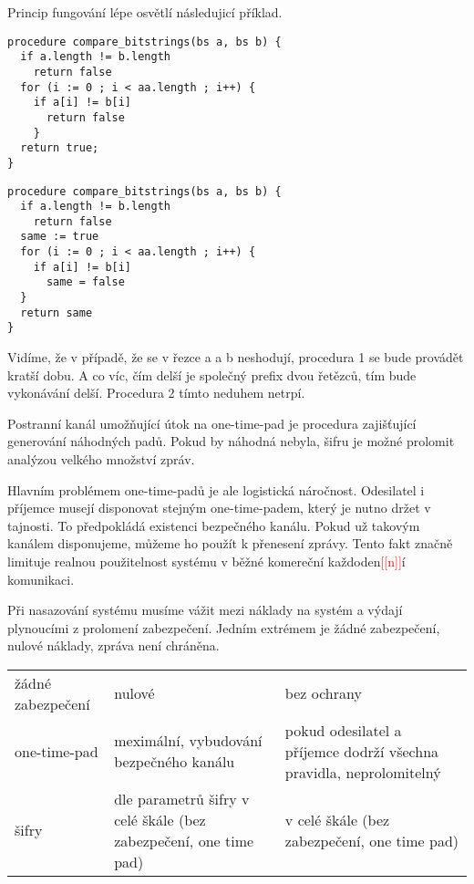 \documentclass[12pt]{article}
\newcommand\todo[1]{\textcolor{red}{[[#1]]}}
\begin{document}
Princip fungování lépe osvětlí následujicí příklad.

\begin{lstlisting}
procedure compare_bitstrings(bs a, bs b) {
  if a.length != b.length
    return false
  for (i := 0 ; i < aa.length ; i++) {
    if a[i] != b[i]
      return false
    }
  return true;
}
\end{lstlisting}

\begin{lstlisting}
procedure compare_bitstrings(bs a, bs b) {
  if a.length != b.length
    return false
  same := true
  for (i := 0 ; i < aa.length ; i++) {
    if a[i] != b[i]
      same = false
  }
  return same
}  
\end{lstlisting}


Vidíme, že v případě, že se v řezce a a b neshodují, procedura 1 se bude provádět kratší dobu. A co víc, čím delší je společný prefix dvou řetězců, tím bude vykonávání delší. Procedura 2 tímto neduhem netrpí.

Postranní kanál umožňující útok na one-time-pad je procedura zajišťující generování náhodných padů. Pokud by náhodná nebyla, šifru je možné prolomit analýzou velkého množství zpráv.

Hlavním problémem one-time-padů je ale logistická náročnost. Odesilatel i příjemce musejí disponovat stejným one-time-padem, který je nutno držet v tajnosti. To předpokládá existenci bezpečného kanálu. Pokud už takovým kanálem disponujeme, můžeme ho použít k přenesení zprávy.
Tento fakt značně limituje realnou použitelnost systému v běžné komereční každoden\todo{n}í  komunikaci.

Při nasazování systému musíme vážit mezi náklady na systém a výdají plynoucími z prolomení zabezpečení.
Jedním extrémem je žádné zabezpečení, nulové náklady, zpráva není chráněna.




\begin{tabularx}{\linewidth}{XXX}
žádné zabezpečení & nulové & bez ochrany \\[0.25cm]
one-time-pad & meximální, vybudování bezpečného kanálu & pokud odesilatel a příjemce dodrží všechna pravidla, neprolomitelný\\[0.25cm]
šifry & dle parametrů šifry v celé škále (bez zabezpečení, one time pad) & v celé škále (bez zabezpečení, one time pad)
\end{tabularx}
\end{document}
